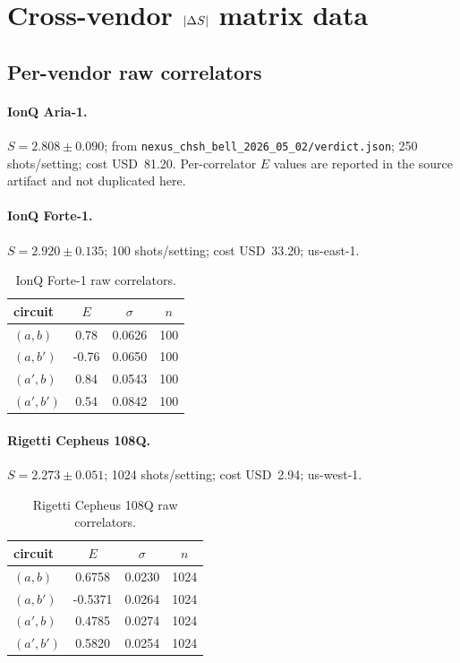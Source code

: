 \section{Cross-vendor $\lvert\Delta S\rvert$ matrix data}\label{app:xvendor}

\subsection{Per-vendor raw correlators}

\paragraph{IonQ Aria-1.}
$S = 2.808 \pm 0.090$; from
\texttt{nexus\_chsh\_bell\_2026\_05\_02/verdict.json}; 250
shots/setting; cost USD~81.20. Per-correlator $E$ values are reported
in the source artifact and not duplicated here.

\paragraph{IonQ Forte-1.}
$S = 2.920 \pm 0.135$; 100 shots/setting; cost USD~33.20; us-east-1.

\begin{table}[htbp]
\centering
\caption{IonQ Forte-1 raw correlators.}
\label{tab:correlators_forte}
\footnotesize
\begin{tabular}{l c c c}
\toprule
circuit & $E$ & $\sigma$ & $n$ \\
\midrule
$(a, b)$   &  0.78 & 0.0626 & 100 \\
$(a, b')$  & -0.76 & 0.0650 & 100 \\
$(a', b)$  &  0.84 & 0.0543 & 100 \\
$(a', b')$ &  0.54 & 0.0842 & 100 \\
\bottomrule
\end{tabular}
\end{table}

\paragraph{Rigetti Cepheus 108Q.}
$S = 2.273 \pm 0.051$; 1024 shots/setting; cost USD~2.94; us-west-1.

\begin{table}[htbp]
\centering
\caption{Rigetti Cepheus 108Q raw correlators.}
\label{tab:correlators_rigetti}
\footnotesize
\begin{tabular}{l c c c}
\toprule
circuit & $E$ & $\sigma$ & $n$ \\
\midrule
$(a, b)$   &  0.6758 & 0.0230 & 1024 \\
$(a, b')$  & -0.5371 & 0.0264 & 1024 \\
$(a', b)$  &  0.4785 & 0.0274 & 1024 \\
$(a', b')$ &  0.5820 & 0.0254 & 1024 \\
\bottomrule
\end{tabular}
\end{table}


